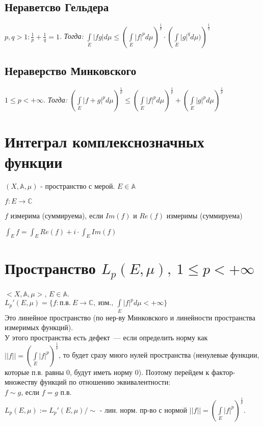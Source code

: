 \documentclass[paper=a4, fontsize=17pt]{article}
\begin{document}
	\subsection{Нераветсво Гельдера}
	$p, q > 1 : \frac{1}{p} + \frac{1}{q} = 1$.
	\emph{Тогда:}
	${\displaystyle \int\limits_E |fg|d\mu \leq \left(\int\limits_E |f|^p d\mu\right)^\frac{1}{p} \cdot \left(\int\limits_E |g|^q d\mu)\right)^\frac{1}{q}}$
	\subsection{Нераверство Минковского}
	$1 \leq p < +\infty$.
	\emph{Тогда:}
	${\displaystyle \left(\int\limits_E |f + g|^p d\mu \right)^\frac{1}{p}
		\leq \left(\int\limits_E |f|^p d\mu\right)^\frac{1}{p}
		+ \left(\int\limits_E |g|^p d\mu\right)^\frac{1}{p}}$

	\section{Интеграл комплекснозначных функции}
	$(X, \mathds{A}, \mu)$ - пространство с мерой. $E \in \mathds{A}$
	
	$f: E \rightarrow \mathds{C}$
	
	$f$ измерима (суммируема), если $Im(f)$ и $Re(f)$ измеримы (суммируема)
	
	$\int_E f =\int_E Re(f) + i \cdot \int_E Im(f) $ 

	\section{Пространство $L_p(E,\mu),\ 1 \leq p < +\infty$}
	$<X, \mathds{A}, \mu>$, $E \in \mathds{A}$.\\
	$L_p'(E, \mu) = \{ f : \text{п.в.}\ E \rightarrow \mathbb{C},\ \text{изм.},\ \int\limits_E |f|^p d\mu < +\infty \}$\\
	Это линейное пространство (по нер-ву Минковского и линейности пространства измеримых функций).\\
	У этого пространства есть дефект~--- если определить норму как $||f|| = \left(\int\limits_E |f|^p\right)^\frac{1}{p}$, то будет сразу много нулей пространства (ненулевые функции, которые п.в. равны $0$, будут иметь норму $0$).
	Поэтому перейдем к фактор-множеству функций по отношению эквивалентности:\\
	$f \sim g$, если $f = g$ п.в.\\
	$ L_p(E, \mu) := L_p'(E, \mu) / \sim$ - лин. норм. пр-во с нормой $||f|| = \left(\int\limits_E |f|^p\right)^\frac{1}{p}$.\\
\end{document}

